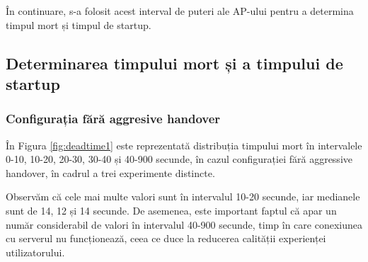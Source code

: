 În continuare, s-a folosit acest interval de puteri ale AP-ului pentru a determina timpul mort și timpul de startup.

\subsection{Determinarea timpului mort și a timpului de startup}

\subsubsection{Configurația fără aggresive handover}

În Figura \ref{fig:deadtime1} este reprezentată distribuția timpului mort în intervalele 0-10, 10-20, 20-30, 30-40 și 40-900 secunde, în cazul configurației fără aggressive handover, în cadrul a trei experimente distincte. 

Observăm că cele mai multe valori sunt în intervalul 10-20 secunde, iar medianele sunt de 14, 12 și 14 secunde. De asemenea, este important faptul că apar un număr considerabil de valori în intervalul 40-900 secunde, timp în care conexiunea cu serverul nu funcționează, ceea ce duce la reducerea calității experienței utilizatorului. 

